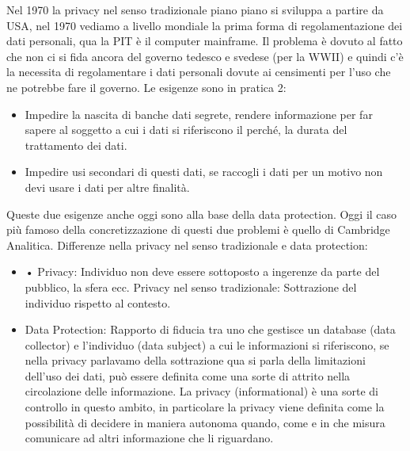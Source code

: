 \documentclass[a4page, 11pt, twocolumn]{article}
\begin{document}
Nel 1970 la privacy nel senso tradizionale piano piano si sviluppa a partire da USA, nel 1970 vediamo a livello mondiale la prima forma di regolamentazione dei dati personali, qua la PIT è il computer mainframe. Il problema è dovuto al fatto che non ci si fida ancora del governo tedesco e svedese (per la WWII) e quindi c’è la necessita di regolamentare i dati personali dovute ai censimenti per l’uso che ne potrebbe fare il governo. Le esigenze sono in pratica 2:
\begin{itemize}
	\item Impedire la nascita di banche dati segrete, rendere informazione per far sapere al soggetto a cui i dati si riferiscono il perché, la durata del trattamento dei dati.
	\item Impedire usi secondari di questi dati, se raccogli i dati per un motivo non devi usare i dati per altre finalità.
\end{itemize}
Queste due esigenze anche oggi sono alla base della data protection. Oggi il caso più famoso della concretizzazione di questi due problemi è quello di Cambridge Analitica. \newline
Differenze nella privacy nel senso tradizionale e data protection:
\begin{itemize}
	\item     • Privacy: Individuo non deve essere sottoposto a ingerenze da parte del pubblico, la sfera ecc. \newline
	Privacy nel senso tradizionale: Sottrazione del individuo rispetto al contesto.
	\item Data Protection: Rapporto di fiducia tra uno che gestisce un database (data collector) e l’individuo (data subject) a cui le informazioni si riferiscono, se nella privacy parlavamo della sottrazione qua si parla della limitazioni dell’uso dei dati, può essere definita come una sorte di attrito nella circolazione delle informazione. La privacy (informational) è una sorte di controllo in questo ambito, in particolare la privacy viene definita come la possibilità di decidere in maniera autonoma quando, come e in che misura comunicare ad altri informazione che li riguardano. 
\end{itemize}
\end{document}
